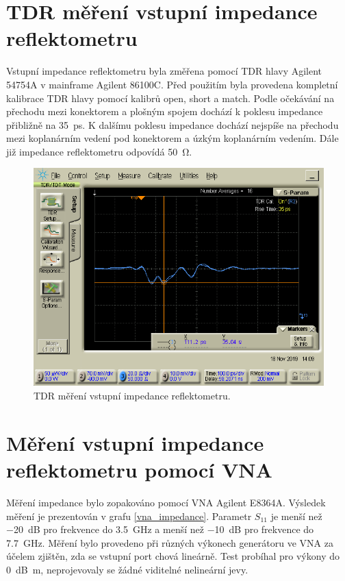 \section{TDR měření vstupní impedance reflektometru}
Vstupní impedance reflektometru byla změřena pomocí TDR hlavy Agilent 54754A v mainframe Agilent 86100C. Před použitím byla provedena kompletní kalibrace TDR hlavy pomocí kalibrů open, short a match. Podle očekávání na přechodu mezi konektorem a plošným spojem dochází k poklesu impedance přibližně na \SI{35}{\pico\second}. K dalšímu poklesu impedance dochází nejspíše na přechodu mezi koplanárním vedení pod konektorem a úzkým koplanárním vedením. Dále již impedance reflektometru odpovídá \SI{50}{\ohm}.
\begin{figure}[htbp]
\includegraphics[width=\textwidth,keepaspectratio]{images/measurements/tdr_profile.png}\caption{TDR měření vstupní impedance reflektometru.}\label{tdr_profile}
\end{figure}

\section{Měření vstupní impedance reflektometru pomocí VNA}
Měření impedance bylo zopakováno pomocí \acrshort{VNA} Agilent E8364A. Výsledek měření je prezentován v grafu \ref{vna_impedance}. Parametr $S_{11}$ je menší než \SI{-20}{\deci\bel} pro frekvence do \SI{3.5}{\giga\hertz} a menší než \SI{-10}{\deci\bel} pro frekvence do \SI{7.7}{\giga\hertz}. Měření bylo provedeno při různých výkonech generátoru ve VNA za účelem zjištěn, zda se vstupní port chová lineárně. Test probíhal pro výkony do \SI{0}{\deci\bel m}, neprojevovaly se žádné viditelné nelineární jevy.

